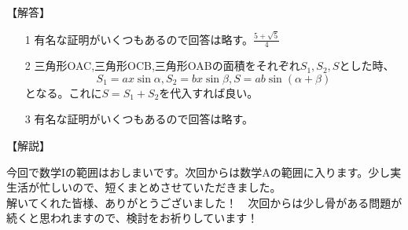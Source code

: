 \documentclass[a4paper,fleqn,dvipdfmx]{jsarticle}
\begin{document}
\begin{flushleft}
【解答】
\end{flushleft}

\begin{itemize}
    \item [1] 
    有名な証明がいくつもあるので回答は略す。$\frac{5+\sqrt{5}}{4}$
    
    \item [2]
    三角形OAC,三角形OCB,三角形OABの面積をそれぞれ$S_1,S_2,S$とした時、
    $$S_1=ax\sin\alpha,S_2=bx\sin\beta,S=ab\sin(\alpha+\beta)$$
    となる。これに$S=S_1+S_2$を代入すれば良い。
    
    \item [3]
    有名な証明がいくつもあるので回答は略す。
    
\end{itemize}


\begin{flushleft}
【解説】
\end{flushleft}

今回で数学Iの範囲はおしまいです。次回からは数学Aの範囲に入ります。少し実生活が忙しいので、短くまとめさせていただきました。\\
解いてくれた皆様、ありがとうございました！　次回からは少し骨がある問題が続くと思われますので、検討をお祈りしています！
\end{document}
